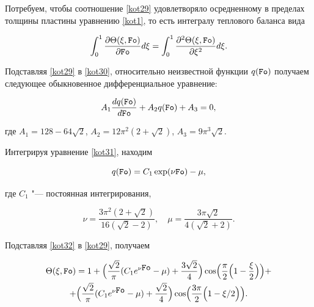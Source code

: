 Потребуем, чтобы соотношение \eqref{kot29} удовлетворяло осредненному в пределах толщины пластины уравнению \eqref{kot1}, то есть интегралу теплового баланса вида

\begin{equation}

\label{kot30}

\int_0^1

\frac{\partial\Theta(\xi,\mbox{\tt Fo})}{\partial\mbox{\tt Fo}}d\xi=

\int_0^1

\frac{\partial^2\Theta(\xi,\mbox{\tt Fo})}{\partial\xi^2}d\xi.

\end{equation}



Подставляя \eqref{kot29} в \eqref{kot30}, относительно неизвестной функции $q(\mbox{\tt Fo})$ получаем следующее обыкновенное дифференциальное уравнение:

\begin{equation}

\label{kot31}

A_1\frac{dq(\mbox{\tt Fo})}{d\mbox{\tt Fo}}+A_2q(\mbox{\tt Fo})+A_3=0,

\end{equation}

где $A_1=128-64\sqrt{2}$, $A_2=12\pi^2(2+\sqrt{2})$, $A_3=9\pi^3\sqrt{2}$.

Интегрируя уравнение \eqref{kot31}, находим

\begin{equation}

\label{kot32}

q(\mbox{\tt Fo})=C_1\exp(\nu\mbox{\tt Fo})-\mu,

\end{equation}

где $C_1$ "--- постоянная интегрирования, 

$$\nu=\frac{3\pi^2(2+\sqrt{2})}{16(\sqrt{2}-2)}, \quad \mu=\frac{3\pi\sqrt{2}}{ 4(\sqrt{2}+2)}.$$



Подставляя \eqref{kot32} в \eqref{kot29}, получаем

\begin{multline}

\label{kot33}

\Theta(\xi,\mbox{\tt Fo})=1+ \Bigl(\frac{\sqrt{2}}{\pi}(C_1 e^{\nu\mbox{\tt Fo}}-\mu)+ \frac{3\sqrt{2}}4\Bigr)

\cos\Bigl(\frac \pi 2\Bigl(1-\frac\xi 2\Bigr)\Bigr)+ 

\\

+\Bigl( \frac{\sqrt{2}}\pi (C_1 e^{\nu\mbox{\tt Fo}}-\mu)+ \frac{\sqrt{2}} 4\Bigr)

\cos\Bigl(\frac{3\pi} 2\Bigl(1-\xi/2\Bigr)\Bigr).

\end{multline}



